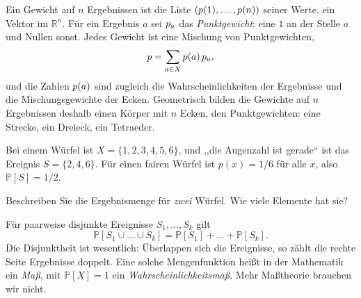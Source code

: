 
\begin{webonly}
Ein Gewicht auf $n$ Ergebnissen ist die Liste $(p(1), \dots, p(n))$ seiner Werte, ein Vektor im $\mathbb{R}^n$. Für ein Ergebnis $a$ sei $p_a$ das \emph{Punktgewicht}: eine $1$ an der Stelle $a$ und Nullen sonst. Jedes Gewicht ist eine Mischung von Punktgewichten,
\begin{equation*}
	p = \sum_{a \in X} p(a)\, p_a ,
\end{equation*}
und die Zahlen $p(a)$ sind zugleich die Wahrscheinlichkeiten der Ergebnisse und die Mischungsgewichte der Ecken. Geometrisch bilden die Gewichte auf $n$ Ergebnissen deshalb einen Körper mit $n$ Ecken, den Punktgewichten: eine Strecke, ein Dreieck, ein Tetraeder.
\end{webonly}


\begin{beispiel}
	Bei einem Würfel ist $X = \{1, 2, 3, 4, 5, 6\}$, und ,,die Augenzahl ist gerade`` ist das Ereignis $S = \{2, 4, 6\}$. Für einen fairen Würfel ist $p(x) = 1/6$ für alle $x$, also $\mathbb{P}[S] = 1/2$.
\end{beispiel}

\begin{übung}
	Beschreiben Sie die Ergebnismenge für \emph{zwei} Würfel. Wie viele Elemente hat sie?
\end{übung}

Für paarweise disjunkte Ereignisse $S_1, \dots, S_k$ gilt
\begin{equation}
	\mathbb{P}[S_1 \cup \dots \cup S_k] = \mathbb{P}[S_1] + \dots + \mathbb{P}[S_k].
\end{equation}
Die Disjunktheit ist wesentlich: Überlappen sich die Ereignisse, so zählt die rechte Seite Ergebnisse doppelt. Eine solche Mengenfunktion heißt in der Mathematik ein \emph{Maß}, mit $\mathbb{P}[X] = 1$ ein \emph{Wahrscheinlichkeitsmaß}. Mehr Maßtheorie brauchen wir nicht.


